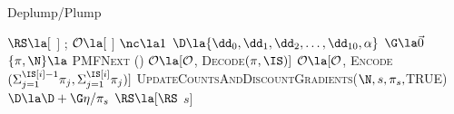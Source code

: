\begin{algorithm}[t!]
    \caption{Deplump/Plump} \label{alg:deplump/plump}
    \begin{algorithmic}[1]
		\State $\RS \la [$ $]$ ;  $\mathcal{O} \la  [$ $]$%
		\State $\nc \la 1$ 
		\State $\D \la  \{ \dd_0, \dd_1, \dd_2, \dots, \dd_{10}, \alpha \}$ 
			\State $\G \la \vec 0$ 
			\State $ \{ \pi, \N  \} \la$  \textsc{PMFNext} (\RS)
				\State $\mathcal{O} \la [\mathcal{O}$,  \textsc{Decode}$(\pi, \IS)]$
			\Else
				\State $\mathcal{O}\la [\mathcal{O}$,   \textsc{Encode}$(\Sigma_{j= 1}^{\IS[i]-1} \pi_j, \Sigma_{j = 1}^{\IS[i]} \pi_j)]$		
			\EndIf
			\State \textsc{UpdateCountsAndDiscountGradients}($\N,s,\pi_s,$TRUE)
			\State $\D \la \D + \G \eta / \pi_s$ 
			\State $\RS \la [\RS$ $s]$ 
		\EndFor
	\EndProcedure
	\end{algorithmic}
\end{algorithm}

